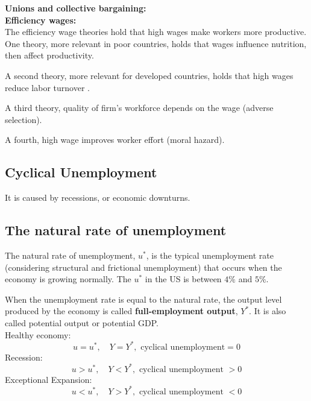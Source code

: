 \documentclass[12pt]{article}
\begin{document}
{\textbf {Unions and collective bargaining:}}
\\



{\textbf {Efficiency wages:}}\\
The efficiency wage theories hold that high wages make workers more productive.\\
One theory, more relevant in poor countries, holds that wages influence nutrition,
then affect productivity.

A second theory, more relevant for developed countries, holds that high wages reduce 
labor turnover .

A third theory, quality of firm's workforce depends on the wage (adverse selection).


A fourth, high wage improves worker effort (moral hazard).






\subsection{Cyclical Unemployment}
It is caused by recessions, or economic downturns.





\subsection{The natural rate of unemployment}
The natural rate of unemployment, $ u^{*} $, is the typical unemployment rate
(considering structural and frictional unemployment)
that occurs when the economy is growing normally. The $ u^{*} $ in the US is between
$ 4\% $ and $ 5\% $.


When the unemployment rate is equal to the natural rate, the output level produced by
the economy is called {\textbf {full-employment output}}, $ Y^{*} $. It is also called 
potential output or potential GDP.\\



Healthy economy:
\begin{equation*}
u = u^{*}, \quad Y = Y^{*}, \text{ cyclical unemployment} = 0
\end{equation*}
Recession:
\begin{equation*}
u > u^{*}, \quad Y < Y^{*}, \text{ cyclical unemployment } > 0
\end{equation*}
Exceptional Expansion:
\begin{equation*}
u < u^{*}, \quad Y > Y^{*}, \text{ cyclical unemployment } < 0
\end{equation*}
\end{document}
